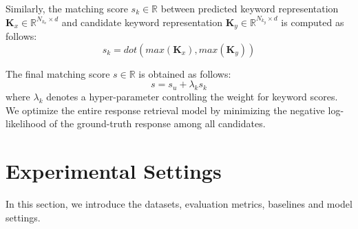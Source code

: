 \documentclass[letterpaper]{article} %
\begin{document}
Similarly, the matching score $s_k \in \mathbb{R}$ between predicted keyword representation $\mathbf{K}_x \in \mathbb{R}^{N_{k_x} \times d}$ and candidate keyword representation $\mathbf{K}_y \in \mathbb{R}^{N_{k_y} \times d}$ is computed as follows:
\begin{equation}
\label{eqn: keyword matching}
s_k = \textit{dot}(\textit{max}(\mathbf{K}_x), \textit{max}(\mathbf{K}_y))
\end{equation}

The final matching score $s \in \mathbb{R}$ is obtained as follows:
\begin{equation}
\label{eqn: final matching}
s = s_u + \lambda_k s_k
\end{equation}
where $\lambda_k$ denotes a hyper-parameter controlling the weight for keyword scores. We optimize the entire response retrieval model by minimizing the negative log-likelihood of the ground-truth response among all candidates.

\section{Experimental Settings}
\label{sec: experiments}
In this section, we introduce the datasets, evaluation metrics, baselines and model settings.
\end{document}
